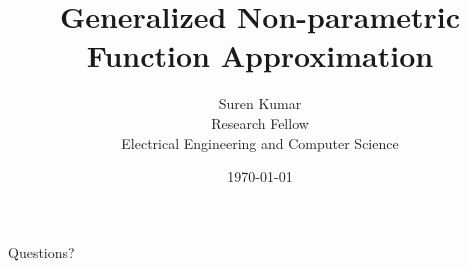 \documentclass[10pt, compress]{beamer}
\title{Generalized Non-parametric Function Approximation}
\author{Suren Kumar \\ Research Fellow \\ Electrical Engineering and Computer Science}
\institute{University of Michigan, Ann Arbor \\ \url{https://github.com/surenkum/uq_gaussian_processes}}
\date{\today}
\begin{document}
\maketitle





\begin{frame}[standout]
Questions?
\end{frame}
\end{document}
